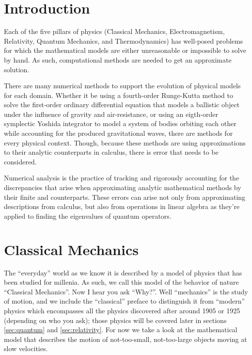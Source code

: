 \documentclass{report}
\begin{document}
\chapter{Introduction}

    Each of the five pillars of physics (Classical Mechanics, Electromagnetism, Relativity, Quantum Mechanics, and Thermodynamics) has well-posed problems for which the mathematical models are either unreasonable or impossible to solve by hand.  As such, computational methods are needed to get an approximate solution.  
    
    There are many numerical methods to support the evolution of physical models for each domain.  Whether it be using a fourth-order Runge-Kutta method to solve the first-order ordinary differential equation  that models a ballistic object under the influence of gravity and air-resistance, or using an eigth-order symplectic Yoshida integrator to model a system of bodies orbiting each other while accounting for the produced gravitational waves, there are methods for every physical context.  Though, because these methods are using approximations to their analytic counterparts in calculus, there is error that needs to be considered.

    Numerical analysis is the practice of tracking and rigorously accounting for the discrepancies that arise when approximating analytic mathematical methods by their finite and counterparts.  These errors can arise not only from approximating descriptions from calculus, but also from operations in linear algebra as they're applied to finding the eigenvalues of quantum operators.

\chapter{Classical Mechanics} \label{sec:classical}

    The ``everyday'' world as we know it is described by a model of physics that has been studied for millenia.  As such, we call this model of the behavior of nature ``Classical Mechanics''.  Now I hear you ask ``Why?''.  Well ``mechanics'' is the study of motion, and we include the ``classical'' preface to distinguish it from ``modern'' physics which encompasses all the physics discovered after around 1905 or 1925 (depending on who you ask); those physics will be covered later in sections \ref{sec:quantum} and \ref{sec:relativity}.  For now we take a look at the mathematical model that describes the motion of not-too-small, not-too-large objects moving at slow velocities.
    
\end{document}
